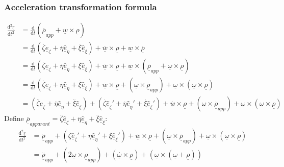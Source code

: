 \documentclass[12pt]{article}
\newcommand{\uvec}[1]{\underline{\hat{#1}}}
\newcommand{\bvec}[1]{\uvec{e}_#1}
\newcommand{\df}[2]{\frac{\text{d}#1}{\text{d}#2}}
\begin{document}
\subsubsection*{Acceleration transformation formula}
\begin{align*}
    \df{^2\underline{r}}{t^2}&=\df{}{t}\left(\overset{.}{\underline{\rho}}_{app}+\underline{w}\times\underline{\rho}\right) \\
    &=\df{}{t}\left(\overset{.}{\zeta}\bvec{\zeta}+\overset{.}{\eta}\bvec{\eta}+\overset{.}{\xi}\bvec{\xi}\right)+\overset{.}{\underline{w}}\times\underline{\rho}+\underline{w}\times\overset{.}{\underline{\rho}} \\
    &=\df{}{t}\left(\overset{.}{\zeta}\bvec{\zeta}+\overset{.}{\eta}\bvec{\eta}+\overset{.}{\xi}\bvec{\xi}\right)+\overset{.}{\underline{w}}\times\underline{\rho}+\underline{w}\times\left(\overset{.}{\underline{\rho}}_{app}+\underline{\omega}\times\underline{\rho}\right) \\
    &=\df{}{t}\left(\overset{.}{\zeta}\bvec{\zeta}+\overset{.}{\eta}\bvec{\eta}+\overset{.}{\xi}\bvec{\xi}\right)+\overset{.}{\underline{w}}\times\underline{\rho}+\left(\underline{\omega}\times\overset{.}{\underline{\rho}}_{app}\right)+\underline{\omega}\times\left(\underline{\omega}\times\underline{\rho}\right) \\
    &=\left(\overset{..}{\zeta}\bvec{\zeta}+\overset{..}{\eta}\bvec{\eta}+\overset{..}{\xi}\bvec{\xi}\right)+\left(\overset{.}{\zeta}{\bvec{\zeta}'}+\overset{.}{\eta}\bvec{\eta}'+\overset{.}{\xi}\bvec{\xi}'\right)+\overset{.}{\underline{w}}\times\underline{\rho}+\left(\underline{\omega}\times\overset{.}{\underline{\rho}}_{app}\right)+\underline{\omega}\times\left(\underline{\omega}\times\underline{\rho}\right)
\end{align*}
Define \(\overset{..}{\underline{\rho}}_{apparant}=\overset{..}{\zeta}\bvec{\zeta}+\overset{..}{\eta}\bvec{\eta}+\overset{..}{\xi}\bvec{\xi}\):
\begin{align*}
    \df{^2\underline{r}}{t^2}&=\overset{..}{\underline{\rho}}_{app}+\left(\overset{.}{\zeta}{\bvec{\zeta}'}+\overset{.}{\eta}\bvec{\eta}'+\overset{.}{\xi}\bvec{\xi}'\right)+\overset{.}{\underline{w}}\times\underline{\rho}+\left(\underline{\omega}\times\overset{.}{\underline{\rho}}_{app}\right)+\underline{\omega}\times\left(\underline{\omega}\times\underline{\rho}\right) \\
    &=\overset{..}{\underline{\rho}}_{app}+\left(2\underline{\omega}\times\overset{.}{\underline{\rho}}_{app}\right)+\left(\overset{.}{\underline{\omega}}\times\underline{\rho}\right)+\left(\underline{\omega}\times\left(\underline{\omega}+\underline{\rho}\right)\right)
\end{align*}
\end{document}

